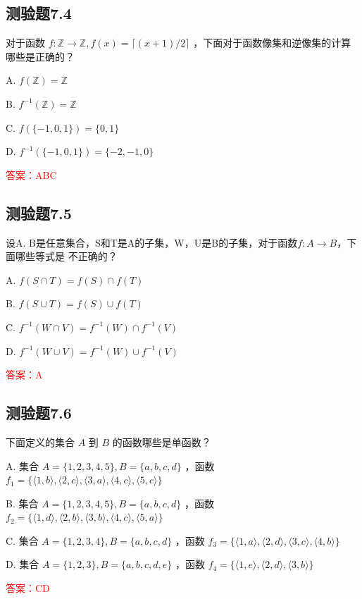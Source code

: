 \documentclass[UTF8, heading=true]{ctexart}
\begin{document}
\subsection{测验题7.4}

对于函数 $f: \mathbb{Z} \rightarrow \mathbb{Z}, f(x)=\lceil(x+1) / 2\rceil$ ，下面对于函数像集和逆像集的计算哪些是正确的？

A. $
f(\mathbb{Z})=\mathbb{Z}
$


B. $
f^{-1}(\mathbb{Z})=\mathbb{Z}
$


C. $
f(\{-1,0,1\})=\{0,1\}
$


D. $
f^{-1}(\{-1,0,1\})=\{-2,-1,0\}
$

\textcolor{red}{答案：ABC}

\subsection{测验题7.5}

设A. B是任意集合，S和T是A的子集，W，U是B的子集，对于函数$f:A\rightarrow B$，下面哪些等式是
不正确的？

A. $f(S \cap T)=f(S) \cap f(T)$

B. $f(S \cup T)=f(S) \cup f(T)$

C. $f^{-1}(W \cap V)=f^{-1}(W) \cap f^{-1}(V)$

D. $f^{-1}(W \cup V)=f^{-1}(W) \cup f^{-1}(V)$

\textcolor{red}{答案：A}


\subsection{测验题7.6}

下面定义的集合 $A$ 到 $B$ 的函数哪些是单函数？

A. 集合 $A=\{1,2,3,4,5\}, B=\{a, b, c, d\}$ ，函数 $f_1=\{\langle 1, b\rangle,\langle 2, c\rangle,\langle 3, a\rangle,\langle 4, c\rangle,\langle 5, c\rangle\}$

B. 集合 $A=\{1,2,3,4,5\}, B=\{a, b, c, d\}$ ，函数 $f_2=\{\langle 1, d\rangle,\langle 2, b\rangle,\langle 3, b\rangle,\langle 4, c\rangle,\langle 5, a\rangle\}$

C. 集合 $A=\{1,2,3,4\}, B=\{a, b, c, d\}$ ，函数 $f_3=\{\langle 1, a\rangle,\langle 2, d\rangle,\langle 3, c\rangle,\langle 4, b\rangle\}$

D. 集合 $A=\{1,2,3\}, B=\{a, b, c, d, e\}$ ，函数 $f_4=\{\langle 1, e\rangle,\langle 2, d\rangle,\langle 3, b\rangle\}$

\textcolor{red}{答案：CD}
\end{document}
